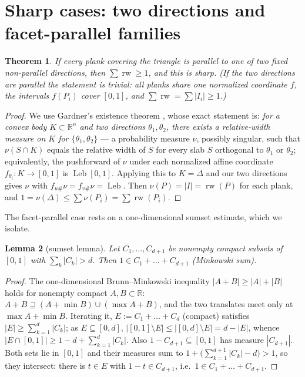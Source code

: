 \documentclass{aims}
\numberwithin{equation}{section}
\theoremstyle{plain}
\newtheorem{theorem}{Theorem}[section]
\newtheorem{lemma}[theorem]{Lemma}
\theoremstyle{definition}
\theoremstyle{remark}
\newcommand{\rw}{\operatorname{rw}}
\newcommand{\Leb}{\operatorname{Leb}}
\newcommand{\R}{\mathbb{R}}
\begin{document}
\section{Sharp cases: two directions and facet-parallel families}\label{sec:sharp}
\begin{theorem}\label{thm:twodir}
If every plank covering the triangle is parallel to one of two fixed
\emph{non-parallel} directions, then $\sum\rw\ge1$, and this is sharp. (If the two
directions are parallel the statement is trivial: all planks share one normalized
coordinate $f$, the intervals $f(P_i)$ cover $[0,1]$, and $\sum\rw=\sum|I_i|\ge1$.)
\end{theorem}
\begin{proof}
We use Gardner's existence theorem \cite[Theorem~1]{Gardner88}, whose exact
statement is: \emph{for a convex body $K\subset\R^n$ and two directions
$\theta_1,\theta_2$, there exists a relative-width measure on $K$ for
$\{\theta_1,\theta_2\}$} --- a probability measure $\nu$, possibly singular,
such that $\nu(S\cap K)$ equals the relative width of $S$ for every slab $S$
orthogonal to $\theta_1$ or $\theta_2$; equivalently, the pushforward of $\nu$
under each normalized affine coordinate $f_{\theta_i}:K\to[0,1]$ is
$\Leb[0,1]$. Applying this to $K=\Delta$ and our two directions gives $\nu$
with $f_{u\#}\nu=f_{v\#}\nu=\Leb$. Then $\nu(P)=|I|=\rw(P)$ for each plank, and
$1=\nu(\Delta)\le\sum\nu(P_i)=\sum\rw(P_i)$.
\end{proof}
The facet-parallel case rests on a one-dimensional sumset estimate, which we
isolate.

\begin{lemma}[sumset lemma]\label{lem:sumset}
Let $C_1,\dots,C_{d+1}$ be nonempty compact subsets of $[0,1]$ with
$\sum_k|C_k|>d$. Then $1\in C_1+\dots+C_{d+1}$ (Minkowski sum).
\end{lemma}
\begin{proof}
The one-dimensional Brunn--Minkowski inequality $|A+B|\ge|A|+|B|$ holds for
nonempty compact $A,B\subset\R$: $A+B\supseteq(A+\min B)\cup(\max A+B)$, and
the two translates meet only at $\max A+\min B$. Iterating it,
$E:=C_1+\dots+C_d$ (compact) satisfies $|E|\ge\sum_{k=1}^d|C_k|$; as
$E\subseteq[0,d]$,
$|[0,1]\setminus E|\le|[0,d]\setminus E|=d-|E|$, whence
$|E\cap[0,1]|\ge1-d+\sum_{k=1}^d|C_k|$. Also $1-C_{d+1}\subseteq[0,1]$ has
measure $|C_{d+1}|$. Both sets lie in $[0,1]$ and their measures sum to
$1+\bigl(\sum_{k=1}^{d+1}|C_k|-d\bigr)>1$, so they intersect: there is $t\in E$
with $1-t\in C_{d+1}$, i.e.\ $1\in C_1+\dots+C_{d+1}$.
\end{proof}
\end{document}
